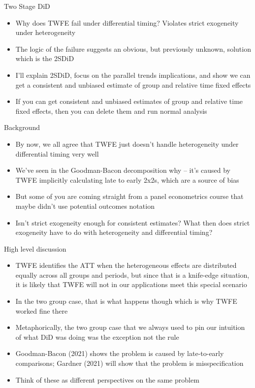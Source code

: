 \documentclass{beamer}
\begin{document}
\begin{frame}{Two Stage DiD}

\begin{itemize}
\item Why does TWFE fail under differential timing? Violates strict exogeneity under heterogeneity
\item The logic of the failure suggests an obvious, but previously unknown, solution which is the 2SDiD
\item I'll explain 2SDiD, focus on the parallel trends implications, and show we can get a consistent and unbiased estimate of group and relative time fixed effects
\item If you can get consistent and unbiased estimates of group and relative time fixed effects, then you can delete them and run normal analysis
\end{itemize}

\end{frame}

\begin{frame}{Background}

\begin{itemize}
\item By now, we all agree that TWFE just doesn't handle heterogeneity under differential timing very well
\item We've seen in the Goodman-Bacon decomposition why -- it's caused by TWFE implicitly calculating late to early 2x2s, which are a source of bias
\item But some of you are coming straight from a panel econometrics course that maybe didn't use potential outcomes notation
\item Isn't strict exogeneity enough for consistent estimates?  What then does strict exogeneity have to do with heterogeneity and differential timing?
\end{itemize}

\end{frame}

\begin{frame}{High level discussion}

\begin{itemize}
\item TWFE identifies the ATT when the heterogeneous effects are distributed equally across all groups and periods, but since that is a knife-edge situation, it is likely that TWFE will not in our applications meet this special scenario
\item In the two group case, that is what happens though which is why TWFE worked fine there
\item Metaphorically, the two group case that we always used to pin our intuition of what DiD was doing was the exception not the rule
\item Goodman-Bacon (2021) shows the problem is caused by late-to-early comparisons; Gardner (2021) will show that the problem is misspecification
\item Think of these as different perspectives on the same problem
\end{itemize}

\end{frame}
\end{document}
